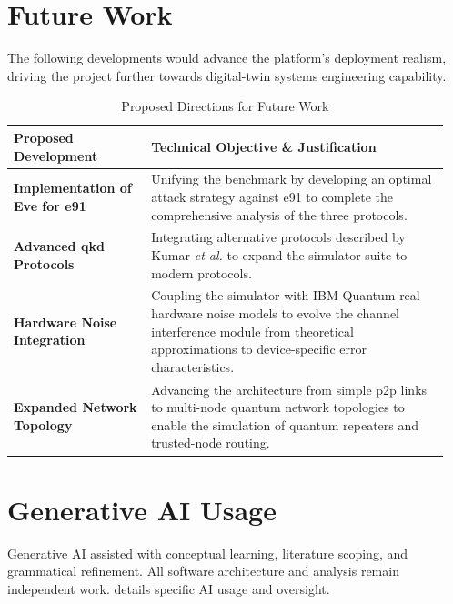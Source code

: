 \documentclass[11pt, a4paper]{report}
\renewcommand{\footnotesize}{\fontsize{9}{10}\selectfont}
\begin{document}
\newpage
\section{Future Work}
\label{sec:future}

The following developments would advance the platform's deployment 
realism, driving the project further towards digital-twin systems engineering capability.

\begin{table}[htbp]
    \centering
    \caption{Proposed Directions for Future Work}
    \label{tab:future_work}
    \footnotesize
    \renewcommand{\arraystretch}{1.4} %
    \begin{tabular}{@{}p{0.3\linewidth} p{0.65\linewidth}@{}}
        \toprule
        \textbf{Proposed Development} & \textbf{Technical Objective \& Justification} \\
        \midrule
        \textbf{Implementation of Eve for \gls{e91}} & Unifying the benchmark by developing an optimal attack strategy against \gls{e91} to complete the comprehensive analysis of the three protocols. \\
        
        \textbf{Advanced \gls{qkd} Protocols} & Integrating alternative protocols described by Kumar \textit{et al.} \cite{Kumar2025} to expand the simulator suite to modern protocols. \\
        
        \textbf{Hardware Noise Integration} & Coupling the simulator with IBM Quantum real hardware noise models to evolve the channel interference module from theoretical approximations to device-specific error characteristics. \\
        
        \textbf{Expanded Network Topology} & Advancing the architecture from simple \gls{p2p} links to multi-node quantum network topologies to enable the simulation of quantum repeaters and trusted-node routing. \\
        \bottomrule
    \end{tabular}
\end{table}

\newpage
\section{Generative AI Usage}
\label{sec:ai_declaration}

Generative AI assisted with conceptual learning, literature scoping, and grammatical refinement. All software architecture and analysis remain independent work.  details specific AI usage and oversight.
\end{document}
